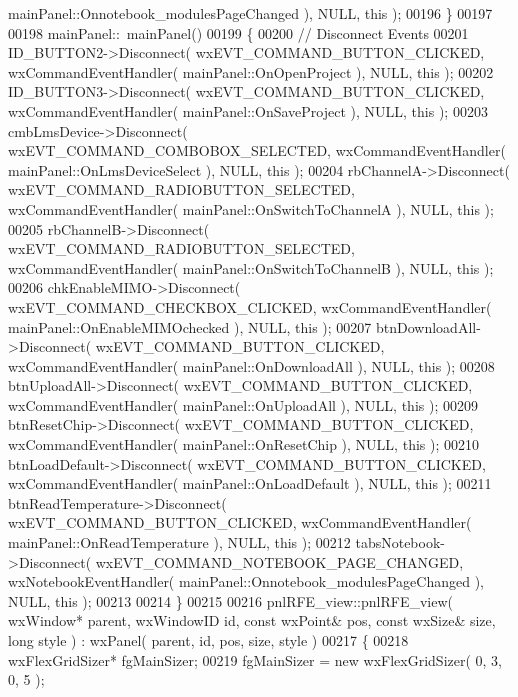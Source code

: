\begin{DoxyCode}
      mainPanel::Onnotebook_modulesPageChanged ), NULL, \textcolor{keyword}{this} );
00196 \}
00197 
00198 mainPanel::~mainPanel()
00199 \{
00200     \textcolor{comment}{// Disconnect Events}
00201     ID_BUTTON2->Disconnect( wxEVT\_COMMAND\_BUTTON\_CLICKED, wxCommandEventHandler( 
      mainPanel::OnOpenProject ), NULL, \textcolor{keyword}{this} );
00202     ID_BUTTON3->Disconnect( wxEVT\_COMMAND\_BUTTON\_CLICKED, wxCommandEventHandler( 
      mainPanel::OnSaveProject ), NULL, \textcolor{keyword}{this} );
00203     cmbLmsDevice->Disconnect( wxEVT\_COMMAND\_COMBOBOX\_SELECTED, wxCommandEventHandler( 
      mainPanel::OnLmsDeviceSelect ), NULL, \textcolor{keyword}{this} );
00204     rbChannelA->Disconnect( wxEVT\_COMMAND\_RADIOBUTTON\_SELECTED, wxCommandEventHandler( 
      mainPanel::OnSwitchToChannelA ), NULL, \textcolor{keyword}{this} );
00205     rbChannelB->Disconnect( wxEVT\_COMMAND\_RADIOBUTTON\_SELECTED, wxCommandEventHandler( 
      mainPanel::OnSwitchToChannelB ), NULL, \textcolor{keyword}{this} );
00206     chkEnableMIMO->Disconnect( wxEVT\_COMMAND\_CHECKBOX\_CLICKED, wxCommandEventHandler( 
      mainPanel::OnEnableMIMOchecked ), NULL, \textcolor{keyword}{this} );
00207     btnDownloadAll->Disconnect( wxEVT\_COMMAND\_BUTTON\_CLICKED, wxCommandEventHandler( 
      mainPanel::OnDownloadAll ), NULL, \textcolor{keyword}{this} );
00208     btnUploadAll->Disconnect( wxEVT\_COMMAND\_BUTTON\_CLICKED, wxCommandEventHandler( 
      mainPanel::OnUploadAll ), NULL, \textcolor{keyword}{this} );
00209     btnResetChip->Disconnect( wxEVT\_COMMAND\_BUTTON\_CLICKED, wxCommandEventHandler( 
      mainPanel::OnResetChip ), NULL, \textcolor{keyword}{this} );
00210     btnLoadDefault->Disconnect( wxEVT\_COMMAND\_BUTTON\_CLICKED, wxCommandEventHandler( 
      mainPanel::OnLoadDefault ), NULL, \textcolor{keyword}{this} );
00211     btnReadTemperature->Disconnect( wxEVT\_COMMAND\_BUTTON\_CLICKED, wxCommandEventHandler( 
      mainPanel::OnReadTemperature ), NULL, \textcolor{keyword}{this} );
00212     tabsNotebook->Disconnect( wxEVT\_COMMAND\_NOTEBOOK\_PAGE\_CHANGED, wxNotebookEventHandler( 
      mainPanel::Onnotebook_modulesPageChanged ), NULL, \textcolor{keyword}{this} );
00213     
00214 \}
00215 
00216 pnlRFE_view::pnlRFE_view( wxWindow* parent, wxWindowID \textcolor{keywordtype}{id}, \textcolor{keyword}{const} wxPoint& pos, \textcolor{keyword}{const} wxSize& 
      size, \textcolor{keywordtype}{long} style ) : wxPanel( parent, id, pos, size, style )
00217 \{
00218     wxFlexGridSizer* fgMainSizer;
00219     fgMainSizer = \textcolor{keyword}{new} wxFlexGridSizer( 0, 3, 0, 5 );

\end{DoxyCode}
